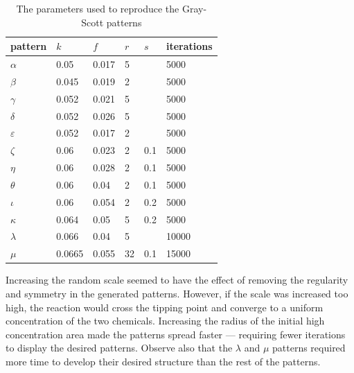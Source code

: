 \begin{table}[H]
    \centering
    \caption{The parameters used to reproduce the Gray-Scott patterns}\label{prob5:tab:parameters}
    \begin{tabular}{@{}llllll@{}}
        \toprule
        pattern       & $k$    & $f$   & $r$ & $s$ & iterations \\ \midrule
        $\alpha$      & 0.05   & 0.017 & 5   &     & 5000       \\
        $\beta$       & 0.045  & 0.019 & 2   &     & 5000       \\
        $\gamma$      & 0.052  & 0.021 & 5   &     & 5000       \\
        $\delta$      & 0.052  & 0.026 & 5   &     & 5000       \\
        $\varepsilon$ & 0.052  & 0.017 & 2   &     & 5000       \\
        $\zeta$       & 0.06   & 0.023 & 2   & 0.1 & 5000       \\
        $\eta$        & 0.06   & 0.028 & 2   & 0.1 & 5000       \\
        $\theta$      & 0.06   & 0.04  & 2   & 0.1 & 5000       \\
        $\iota$       & 0.06   & 0.054 & 2   & 0.2 & 5000       \\
        $\kappa$      & 0.064  & 0.05  & 5   & 0.2 & 5000       \\
        $\lambda$     & 0.066  & 0.04  & 5   &     & 10000      \\
        $\mu$         & 0.0665 & 0.055 & 32  & 0.1 & 15000      \\ \bottomrule
    \end{tabular}
\end{table}

Increasing the random scale seemed to have the effect of removing the regularity and symmetry in the generated patterns.
However, if the scale was increased too high, the reaction would cross the tipping point and converge to a uniform concentration of the two chemicals.
Increasing the radius of the initial high concentration area made the patterns spread faster --- requiring fewer iterations to display the desired patterns.
Observe also that the $\lambda$ and $\mu$ patterns required more time to develop their desired structure than the rest of the patterns.
